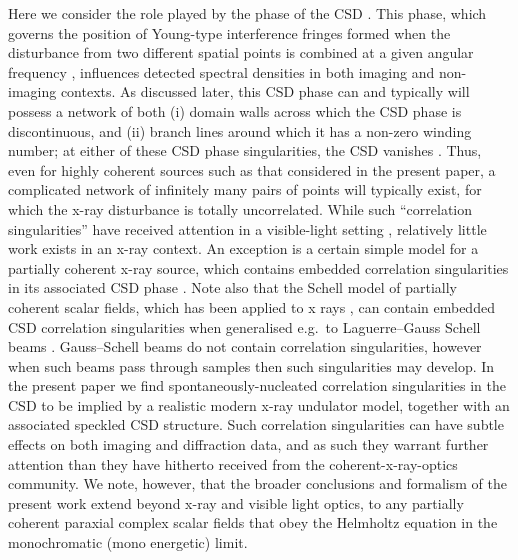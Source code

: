\documentclass[%
 reprint,
 amsmath,amssymb,
 aps,
]{revtex4-1}
\begin{document}
Here we consider the role played by the phase of the CSD \cite{Schouten2003,GburVisser2003,Bogatyryova2003}. This phase, which governs the position of Young-type interference fringes formed when the disturbance from two different spatial points is combined at a given angular frequency \cite{mandel_wolf}, influences detected spectral densities in both imaging and non-imaging contexts.  As discussed later, this CSD phase can and typically will possess a network of both 
(i) domain walls across which the CSD phase is discontinuous, and (ii) branch lines around which it has a non-zero winding number; at either of these CSD phase singularities, the CSD vanishes \cite{TopologicalReactionsCohVortices,Marasinghe2010}.  Thus, even for highly coherent sources such as that considered in the present paper, a complicated network of infinitely many pairs of points will typically exist, for which the x-ray disturbance is totally uncorrelated.  While such ``correlation singularities'' have received attention in a visible-light setting \cite{Schouten2003,GburVisser2003,Bogatyryova2003,FischerVisser2004,Palacios2004,GburVisser2006,Wang2006,TopologicalReactionsCohVortices,GburVisser2010,Rodrigo2015}, relatively little work exists in an x-ray context.  An exception is a certain simple model for a partially coherent x-ray source, which contains embedded correlation singularities in its associated CSD phase  \cite{PellicciaPaganin2012}. Note also that the Schell model of partially coherent scalar fields\cite{mandel_wolf}, which has been applied to x rays \cite{Coisson1997,Vartanyants2010}, can contain embedded CSD correlation singularities when generalised e.g.~to Laguerre--Gauss Schell beams \cite{Palacios2004,Rodrigo2015}.  Gauss--Schell beams do not contain correlation singularities, however when such beams pass through samples then such singularities may develop. In the present paper we find spontaneously-nucleated correlation singularities in the CSD to be implied by a realistic modern x-ray undulator model, together with an associated speckled CSD structure. Such correlation singularities can have subtle effects on both imaging and diffraction data, and as such they warrant further attention than they have hitherto received from the coherent-x-ray-optics community.  We note, however, that the broader conclusions and formalism of the present work extend beyond x-ray and visible light optics, to any partially coherent paraxial complex scalar fields that obey the Helmholtz equation in the monochromatic (mono energetic) limit.
\end{document}
